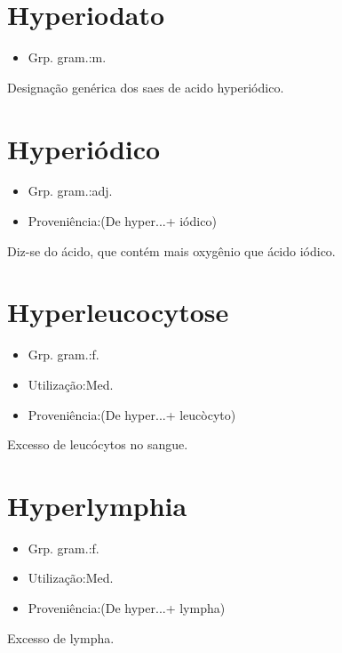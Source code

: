 \documentclass{article}
\begin{document}
\section{Hyperiodato}
\begin{itemize}
\item {Grp. gram.:m.}
\end{itemize}
Designação genérica dos saes de acido hyperiódico.
\section{Hyperiódico}
\begin{itemize}
\item {Grp. gram.:adj.}
\end{itemize}
\begin{itemize}
\item {Proveniência:(De \textunderscore hyper...\textunderscore  + \textunderscore iódico\textunderscore )}
\end{itemize}
Diz-se do ácido, que contém mais oxygênio que ácido iódico.
\section{Hyperleucocytose}
\begin{itemize}
\item {Grp. gram.:f.}
\end{itemize}
\begin{itemize}
\item {Utilização:Med.}
\end{itemize}
\begin{itemize}
\item {Proveniência:(De \textunderscore hyper...\textunderscore  + \textunderscore leucòcyto\textunderscore )}
\end{itemize}
Excesso de leucócytos no sangue.
\section{Hyperlymphia}
\begin{itemize}
\item {Grp. gram.:f.}
\end{itemize}
\begin{itemize}
\item {Utilização:Med.}
\end{itemize}
\begin{itemize}
\item {Proveniência:(De \textunderscore hyper...\textunderscore  + \textunderscore lympha\textunderscore )}
\end{itemize}
Excesso de lympha.
\end{document}
